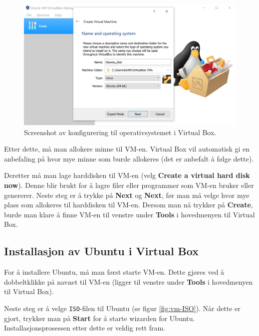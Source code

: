 \begin{figure}[ht]
    \centering
    \includegraphics[scale = .63]{Main/figures/VM_next.JPG}
    \caption{Screenshot av konfigurering til operativsystemet i Virtual Box.}
    \label{fig:vm-nexts}
\end{figure}

Etter dette, må man allokere minne til VM-en. Virtual Box vil automatisk gi en anbefaling på hvor mye minne som burde allokeres (det er anbefalt å følge dette).

Deretter må man lage harddisken til VM-en (velg \textbf{Create a virtual hard disk now}). Denne blir brukt for å lagre filer eller programmer som VM-en bruker eller genererer. Neste steg er å trykke på \textbf{Next} og \textbf{Next}, før man må velge hvor mye plass som allokeres til harddisken til VM-en. Dersom man nå trykker på \textbf{Create}, burde man klare å finne VM-en til venstre under \textbf{Tools} i hovedmenyen til Virtual Box.

\subsection{Installasjon av Ubuntu i Virtual Box}

For å installere Ubuntu, må man først starte VM-en. Dette gjøres ved å dobbeltklikke på navnet til VM-en (ligger til venstre under \textbf{Tools} i hovedmenyen til Virtual Box). 

Neste steg er å velge \verb|ISO|-filen til Ubuntu (se figur \ref{fig:vm-ISO}). Når dette er gjort, trykker man på \textbf{Start} for å starte wizarden for Ubuntu. Installasjonsprosessen etter dette er veldig rett fram.

